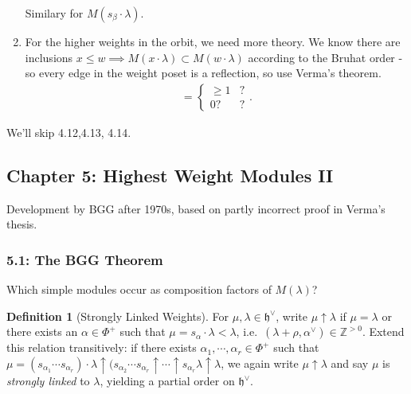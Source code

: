 \documentclass[11pt]{scrartcl}
\theoremstyle{definition}
\theoremstyle{theorem}
\theoremstyle{proof}
\theoremstyle{definition}
\newtheorem{definition}{Definition}[theorem]
\theoremstyle{break}
\theoremstyle{problem}
\newcommand{\ZZ}[0]{{\mathbb{Z}}}
\newcommand{\dual}[0]{^\vee}
\newcommand{\lieh}[0]{{\mathfrak{h}}}
\begin{document}
\begin{enumerate}
  Similary for \(M(s_\beta \cdot \lambda)\).
\item
  For the higher weights in the orbit, we need more theory. We know
  there are inclusions
  \(x\leq w \implies M(x\cdot \lambda) \subset M(w\cdot \lambda)\)
  according to the Bruhat order - so every edge in the weight poset is a
  reflection, so use Verma's theorem. \begin{align*}
   [M(w\cdot \lambda): L(x \cdot \lambda)] = \begin{cases}
   \geq 1 & ? \\
   0? & ?
   \end{cases}
   .\end{align*}
\end{enumerate}

We'll skip 4.12,4.13, 4.14.

\hypertarget{chapter-5-highest-weight-modules-ii}{%
\subsection{Chapter 5: Highest Weight Modules
II}\label{chapter-5-highest-weight-modules-ii}}

Development by BGG after 1970s, based on partly incorrect proof in
Verma's thesis.

\hypertarget{the-bgg-theorem}{%
\subsubsection{5.1: The BGG Theorem}\label{the-bgg-theorem}}

Which simple modules occur as composition factors of \(M(\lambda)\)?

\begin{definition}[Strongly Linked Weights]

For \(\mu, \lambda \in \lieh\dual\), write \(\mu \uparrow \lambda\) if
\(\mu = \lambda\) or there exists an \(\alpha \in \Phi^+\) such that
\(\mu = s_\alpha \cdot \lambda < \lambda\),
i.e.~\((\lambda + \rho, \alpha\dual) \in \ZZ^{> 0}\). Extend this
relation transitively: if there exists
\(\alpha_1, \cdots, \alpha_r \in \Phi^+\) such that
\(\mu = (s_{\alpha_1} \cdots s_{\alpha_r}) \cdot \lambda \uparrow (s_{\alpha_2} \cdots s_{\alpha_r} \uparrow \cdots \uparrow s_{\alpha_r} \lambda \uparrow \lambda\),
we again write \(\mu \uparrow\lambda\) and say \(\mu\) is \emph{strongly
linked} to \(\lambda\), yielding a partial order on
\(\lieh\dual\).\end{definition}
\end{document}
